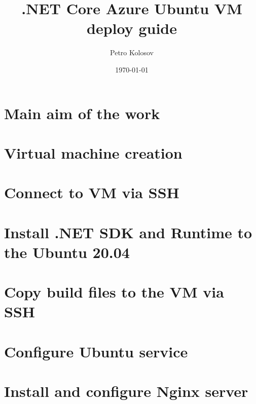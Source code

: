 \documentclass[12pt,letterpaper,oneside,reqno]{amsart}
\title[.NET Core Azure Ubuntu VM deploy guide]
{.NET Core Azure Ubuntu VM deploy guide}
\author[Petro Kolosov]{Petro Kolosov}
\date{\today}
\numberwithin{equation}{section}
\begin{document}
    \begin{abstract}
        
    \end{abstract}

    \maketitle

    \tableofcontents


    \section*{Main aim of the work}
    


    \section{Virtual machine creation}\label{sec:virtual-machine-creation}
    


    \section{Connect to VM via SSH}\label{sec:connect-to-vm-via-ssh}
    


    \section{Install .NET SDK and Runtime to the Ubuntu 20.04}\label{sec:install-.net-sdk-to-ubuntu-20.04}
    


    \section{Copy build files to the VM via SSH}\label{sec:copy-build-files-to-the-vm-via-ssh}
    


    \section{Configure Ubuntu service}\label{sec:configure-ubuntu-service}
    


    \section{Install and configure Nginx server}\label{sec:install-and-configure-nginx-server}
    
\end{document}
